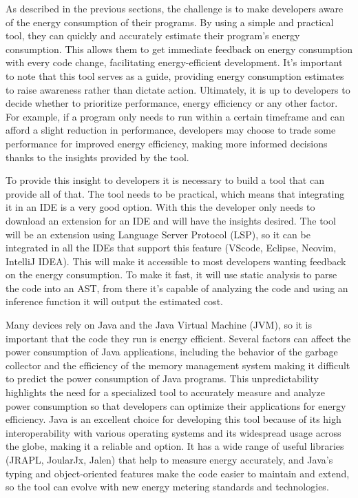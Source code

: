 \documentclass[sigplan]{acmart}
\begin{document}
As described in the previous sections, the challenge is to make developers aware of the energy consumption of their programs. By using a simple and practical tool, they can quickly and accurately estimate their program's energy consumption. This allows them to get immediate feedback on energy consumption with every code change, facilitating energy-efficient development. It's important to note that this tool serves as a guide, providing energy consumption estimates to raise awareness rather than dictate action. Ultimately, it is up to developers to decide whether to prioritize performance, energy efficiency or any other factor. For example, if a program only needs to run within a certain timeframe and can afford a slight reduction in performance, developers may choose to trade some performance for improved energy efficiency, making more informed decisions thanks to the insights provided by the tool.

To provide this insight to developers it is necessary to build a tool that can provide all of that. The tool needs to be practical, which means that integrating it in an IDE is a very good option. With this the developer only needs to download an extension for an IDE and will have the insights desired.
The tool will be an extension using Language Server Protocol (LSP), so it can be integrated in all the IDEs that support this feature (VScode, Eclipse, Neovim, IntelliJ IDEA). This will make it accessible to most developers wanting feedback on the energy consumption. To make it fast, it will use static analysis to parse the code into an AST, from there it's capable of analyzing the code and using an inference function it will output the estimated cost.

Many devices rely on Java and the Java Virtual Machine (JVM), so it is important that the code they run is energy efficient. Several factors can affect the power consumption of Java applications, including the behavior of the garbage collector and the efficiency of the memory management system \cite{10.5555/1267847.1267870} making it difficult to predict the power consumption of Java programs. This unpredictability highlights the need for a specialized tool to accurately measure and analyze power consumption so that developers can optimize their applications for energy efficiency.
Java is an excellent choice for developing this tool because of its high interoperability with various operating systems and its widespread usage across the globe, making it a reliable and option. It has a wide range of useful libraries (JRAPL, JoularJx, Jalen) that help to measure energy accurately, and Java's typing and object-oriented features make the code easier to maintain and extend, so the tool can evolve with new energy metering standards and technologies. 
\end{document}

